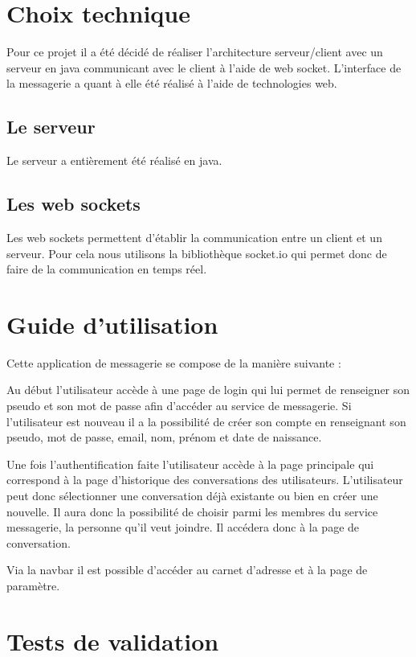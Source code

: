 \section{Choix technique}

\par Pour ce projet il a été décidé de réaliser l'architecture serveur/client avec un serveur en java communicant avec le client à l'aide de web socket. L’interface de la messagerie a quant à elle été réalisé à l'aide de technologies web. 

\subsection{Le serveur}
Le serveur a entièrement été réalisé en java.  

\subsection{Les web sockets}
\par Les web sockets permettent d'établir la communication entre un client et un serveur. Pour cela nous utilisons la bibliothèque socket.io qui permet donc de faire de la communication en temps réel. 


\section{Guide d'utilisation}

\par Cette application de messagerie se compose de la manière suivante : \\

\par Au début l'utilisateur accède à une page de login qui lui permet de renseigner son pseudo et son mot de passe afin d'accéder au service de messagerie. Si l'utilisateur est nouveau il a la possibilité de créer son compte en renseignant son pseudo, mot de passe, email, nom, prénom et date de naissance. 
\par Une fois l'authentification faite l'utilisateur accède à la page principale qui correspond à la page d'historique des conversations des utilisateurs. L'utilisateur peut donc  sélectionner une conversation déjà existante ou bien en créer une nouvelle. Il aura donc la possibilité de choisir parmi les membres du service messagerie, la personne qu'il veut joindre. Il accédera donc à la page de conversation.
\par Via la navbar il est possible d'accéder au carnet d'adresse et à la page de paramètre. 


\section{Tests de validation}